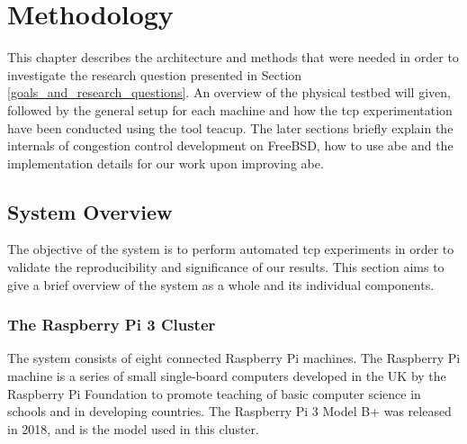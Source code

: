 \chapter{Methodology} \label{ch:methodology}

This chapter describes the architecture and methods that were needed in order to investigate the research question presented in Section \ref{goals_and_research_questions}. An overview of the physical testbed will given, followed by the general setup for each machine and how the \gls{tcp} experimentation have been conducted using the tool \gls{teacup}. The later sections briefly explain the internals of congestion control development on FreeBSD, how to use \gls{abe} and the implementation details for our work upon improving \gls{abe}.









\section{System Overview}

The objective of the system is to perform automated \gls{tcp} experiments in order to validate the reproducibility and significance of our results. This section aims to give a brief overview of the system as a whole and its individual components.




\subsection{The Raspberry Pi 3 Cluster}

The system consists of eight connected Raspberry Pi machines. The Raspberry Pi machine is a series of small single-board computers developed in the UK by the Raspberry Pi Foundation to promote teaching of basic computer science in schools and in developing countries. The Raspberry Pi 3 Model B+ was released in 2018, and is the model used in this cluster.


